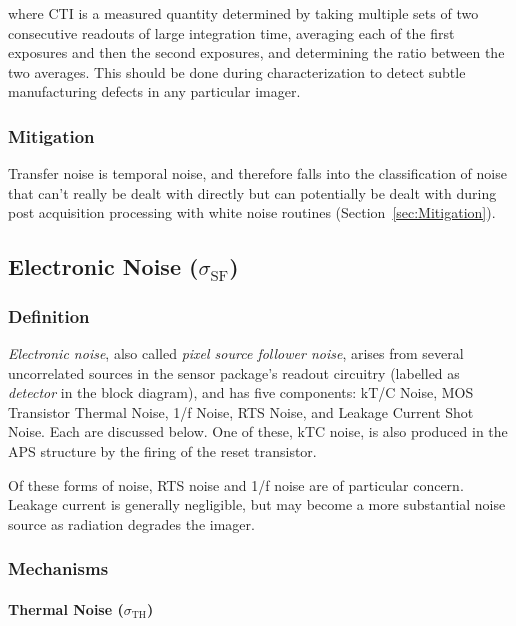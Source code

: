 \documentclass[10pt]{article}
\begin{document}
\vspace{2mm}

\noindent where CTI is a measured quantity determined by taking multiple sets of two consecutive readouts of large integration time, averaging each of the first exposures and then the second exposures, and determining the ratio between the two averages. This should be done during characterization to detect subtle manufacturing defects in any particular imager.

\subsubsection{Mitigation}

Transfer noise is temporal noise, and therefore falls into the classification of noise that can't really be dealt with directly but can potentially be dealt with during post acquisition processing with white noise routines (Section~\ref{sec:Mitigation}).

\subsection{Electronic Noise (\boldmath $\sigma_{\text{SF}}$)}

\subsubsection{Definition}

\emph{Electronic noise}, also called \emph{pixel source follower noise}, arises from several uncorrelated sources in the sensor package's readout circuitry (labelled as \emph{detector} in the block diagram), and has five components: kT/C Noise, MOS Transistor Thermal Noise, 1/f Noise, RTS Noise, and Leakage Current Shot Noise. Each are discussed below. One of these, kTC noise, is also produced in the APS structure by the firing of the reset transistor. 

Of these forms of noise, RTS noise and 1/f noise are of particular concern. Leakage current is generally negligible, but may become a more substantial noise source as radiation degrades the imager.

\subsubsection{Mechanisms}

\paragraph{Thermal Noise  (\boldmath $\sigma_{\text{TH}}$)} 
\end{document}
